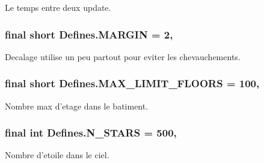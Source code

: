 Le temps entre deux update. 

\hypertarget{classDefines_a9fd7f260f375ce1a158c1b5d7f7b5723}{
\subsubsection[{M\-A\-R\-G\-I\-N}]{\setlength{\rightskip}{0pt plus 5cm}final short Defines.\-M\-A\-R\-G\-I\-N = 2\hspace{0.3cm}{\ttfamily [static]}, {\ttfamily [package]}}}\label{classDefines_a9fd7f260f375ce1a158c1b5d7f7b5723}


Decalage utilise un peu partout pour eviter les chevauchements. 

\hypertarget{classDefines_af60ebfd414a20ac9a7071d1d2a8cddca}{
\subsubsection[{M\-A\-X\-\_\-\-L\-I\-M\-I\-T\-\_\-\-F\-L\-O\-O\-R\-S}]{\setlength{\rightskip}{0pt plus 5cm}final short Defines.\-M\-A\-X\-\_\-\-L\-I\-M\-I\-T\-\_\-\-F\-L\-O\-O\-R\-S = 100\hspace{0.3cm}{\ttfamily [static]}, {\ttfamily [package]}}}\label{classDefines_af60ebfd414a20ac9a7071d1d2a8cddca}


Nombre max d'etage dans le batiment. 

\hypertarget{classDefines_a9b91f7213bd4f6c0b70df0e9903c7691}{
\subsubsection[{N\-\_\-\-S\-T\-A\-R\-S}]{\setlength{\rightskip}{0pt plus 5cm}final int Defines.\-N\-\_\-\-S\-T\-A\-R\-S = 500\hspace{0.3cm}{\ttfamily [static]}, {\ttfamily [package]}}}\label{classDefines_a9b91f7213bd4f6c0b70df0e9903c7691}


Nombre d'etoile dans le ciel. 

